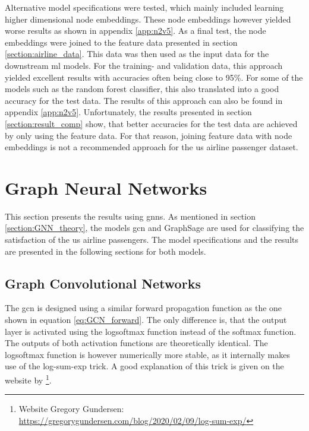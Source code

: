   \noindent Alternative model specifications were tested, which mainly included
  learning higher dimensional node embeddings. These node embeddings however
  yielded worse results as shown in appendix \ref{app:n2v5}. As a final test, 
  the node embeddings were joined to the feature data presented in section 
  \ref{section:airline_data}. This data was then used as the input data for the 
  downstream \acs{ml} models. For the training- and validation data, this 
  approach yielded excellent results with accuracies often being close to 95\%. 
  For some of the models such as the random forest classifier, this also
  translated into a good accuracy for the test data. The results of this
  approach can also be found in appendix \ref{app:n2v5}. Unfortunately, the 
  results presented in section \ref{section:result_comp} show, that better 
  accuracies for the test data are achieved by only using the feature data. For 
  that reason, joining feature data with node embeddings is not a recommended 
  approach for the \acs{us} airline passenger dataset.

  \section{Graph Neural Networks}

  This section presents the results using \acsp{gnn}. As mentioned in section 
  \ref{section:GNN_theory}, the models \acs{gcn} \citep{kipf2016semi} and 
  GraphSage \citep{hamilton2017inductive} are used for classifying the 
  satisfaction of the \acs{us} airline passengers. The model specifications and
  the results are presented in the following sections for both models.

  \subsection{Graph Convolutional Networks}
  \label{section:GCN_results}

  The \acs{gcn} is designed using a similar forward propagation function as the
  one shown in equation \ref{eq:GCN_forward}. The only difference is, that
  the output layer is activated using the logsoftmax function instead of the
  softmax function. The outputs of both activation functions are theoretically 
  identical. The logsoftmax function is however numerically more stable, as it 
  internally makes use of the log-sum-exp trick. A good explanation of this
  trick is given on the website by \cite{gundersen2020}\footnote{Website 
  Gregory Gundersen: \\\url{https://gregorygundersen.com/blog/2020/02/09/log-sum-exp/}}.


